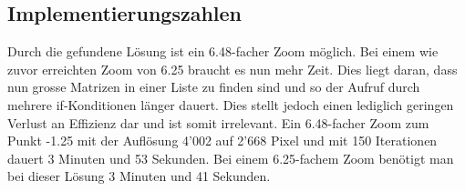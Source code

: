 \subsection{Implementierungszahlen}
Durch die gefundene Lösung ist ein 6.48-facher Zoom möglich. Bei einem wie zuvor erreichten Zoom von 6.25 braucht es nun mehr Zeit. Dies liegt daran, dass nun grosse Matrizen in einer Liste zu finden sind und so der Aufruf durch mehrere if-Konditionen länger dauert. Dies stellt jedoch einen lediglich geringen Verlust an Effizienz dar und ist somit irrelevant. Ein 6.48-facher Zoom zum Punkt -1.25 mit der Auflösung 4’002 auf 2’668 Pixel und mit 150 Iterationen dauert 3 Minuten und 53 Sekunden. Bei einem 6.25-fachem Zoom benötigt man bei dieser Lösung 3 Minuten und 41 Sekunden.
